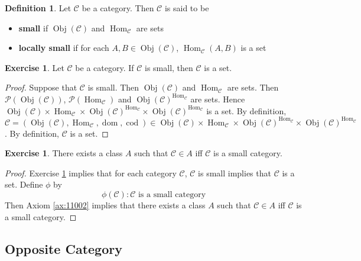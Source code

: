 \documentclass{book}
\theoremstyle{definition}
\newtheorem{defn}[definition]{Definition}
\newtheorem{ex}[definition]{Exercise}
\newcommand{\MC}{\mathcal{C}}
\newcommand{\MP}{\mathcal{P}}
\newcommand{\lex}[1]{\label{ex:#1}}
\newcommand{\rex}[1]{Exercise \ref{ex:#1}}
\newcommand{\ld}[1]{\label{defn:#1}}
\newcommand{\rax}[1]{Axiom \ref{ax:#1}}
\DeclareMathOperator{\dom}{dom}
\DeclareMathOperator{\cod}{cod}
\DeclareMathOperator{\Obj}{Obj}
\DeclareMathOperator{\Hom}{Hom}
\DeclareMathOperator*{\0}{\mbf{0}}
\DeclareMathOperator*{\1}{\mbf{1}}
\begin{document}
	\begin{defn} \ld{12002}
		Let $\MC$ be a category. Then $\MC$ is said to be 
		\begin{itemize}
			\item \textbf{small} if $\Obj(\MC)$ and $\Hom_{\MC}$ are sets
			\item \textbf{locally small} if for each $A,B \in \Obj(\MC)$, $\Hom_{\MC}(A,B)$ is a set 
		\end{itemize}
	\end{defn}

	\begin{ex} \lex{12003}
		Let $\MC$ be a category. If $\MC$ is small, then $\MC$ is a set. 
	\end{ex}

	\begin{proof}
		Suppose that $\MC$ is small. Then $\Obj(\MC)$ and $\Hom_{\MC}$ are sets. Then $\MP(\Obj(\MC))$, $\MP(\Hom_{\MC})$ and $\Obj(\MC)^{\Hom_{\MC}}$ are sets. Hence $\Obj(\MC) \times \Hom_{\MC} \times \Obj(\MC)^{\Hom_{\MC}} \times \Obj(\MC)^{\Hom_{\MC}}$ is a set. By definition, $\MC = (\Obj(\MC), \Hom_{\MC}, \dom, \cod) \in \Obj(\MC) \times \Hom_{\MC} \times \Obj(\MC)^{\Hom_{\MC}} \times \Obj(\MC)^{\Hom_{\MC}}$. By definition, $\MC$ is a set. 
	\end{proof}
	
	\begin{ex} \lex{12004}
		There exists a class $A$ such that $\MC \in A$ iff $\MC$ is a small category. 
	\end{ex}

	\begin{proof}
		\rex{12003} implies that for each category $\MC$, $\MC$ is small implies that $\MC$ is a set. Define $\phi$ by $$\phi(\MC): \MC \text{ is a small category} $$ 
		Then \rax{11002} implies that there exists a class $A$ such that $\MC \in A$ iff $\MC$ is a small category.  
	\end{proof}





















	
	
	\subsection{Opposite Category}
\end{document}
